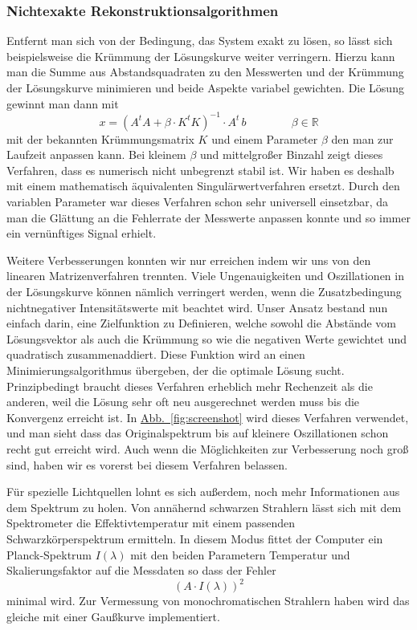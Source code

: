 \documentclass[11pt]{scrartcl}
\newcommand{\hypref}[2]{\hyperref[#2]{{#1}~\ref{#2}}}
\begin{document}
\subsubsection{Nichtexakte Rekonstruktionsalgorithmen}
Entfernt man sich von der Bedingung, das System exakt zu lösen, so lässt sich beispielsweise die Krümmung der Lösungskurve weiter verringern.
Hierzu kann man die Summe aus Abstandsquadraten zu den Messwerten und der Krümmung der Lösungskurve minimieren und beide Aspekte variabel gewichten.
Die Lösung gewinnt man dann mit
\begin{equation}
x = (A^tA+\beta\cdot K^tK)^{-1}\cdot A^t\,b
\qquad\qquad
\beta\in\mathbb{R}
\end{equation}
mit der bekannten Krümmungsmatrix $K$ und einem Parameter $\beta$ den man zur Laufzeit anpassen kann.
Bei kleinem $\beta$ und mittelgroßer Binzahl zeigt dieses Verfahren, dass es numerisch nicht unbegrenzt stabil ist.
Wir haben es deshalb mit einem mathematisch äquivalenten Singulärwertverfahren ersetzt.
Durch den variablen Parameter war dieses Verfahren schon sehr universell einsetzbar, da man die Glättung an die Fehlerrate der Messwerte anpassen konnte und so immer ein vernünftiges Signal erhielt.

Weitere Verbesserungen konnten wir nur erreichen indem wir uns von den linearen Matrizenverfahren trennten.
Viele Ungenauigkeiten und Oszillationen in der Lösungskurve können nämlich verringert werden, wenn die Zusatzbedingung nichtnegativer Intensitätswerte mit beachtet wird.
Unser Ansatz bestand nun einfach darin, eine Zielfunktion zu Definieren, welche sowohl die Abstände vom Lösungsvektor als auch die Krümmung so wie die negativen Werte gewichtet und quadratisch zusammenaddiert.
Diese Funktion wird an einen Minimierungsalgorithmus übergeben, der die optimale Lösung sucht.
Prinzipbedingt braucht dieses Verfahren erheblich mehr Rechenzeit als die anderen, weil die Lösung sehr oft neu ausgerechnet werden muss bis die Konvergenz erreicht ist.
In \hypref{Abb.}{fig:screenshot} wird dieses Verfahren verwendet, und man sieht dass das Originalspektrum bis auf kleinere Oszillationen schon recht gut erreicht wird.
Auch wenn die Möglichkeiten zur Verbesserung noch groß sind, haben wir es vorerst bei diesem Verfahren belassen.

Für spezielle Lichtquellen lohnt es sich außerdem, noch mehr Informationen aus dem Spektrum zu holen.
Von annähernd schwarzen Strahlern lässt sich mit dem Spektrometer die Effektivtemperatur mit einem passenden Schwarzkörperspektrum ermitteln.
In diesem Modus fittet der Computer ein Planck-Spektrum $I(\lambda)$ mit den beiden Parametern Temperatur und Skalierungsfaktor auf die Messdaten so dass der Fehler
\begin{equation}
\left(
A\cdot I(\lambda)
\right)^2
\end{equation}
minimal wird.
Zur Vermessung von monochromatischen Strahlern haben wird das gleiche mit einer Gaußkurve implementiert.
\end{document}

